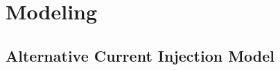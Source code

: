
\chapter{Modeling}






\section{Alternative Current Injection Model}
\label{app:current-injection-model}

